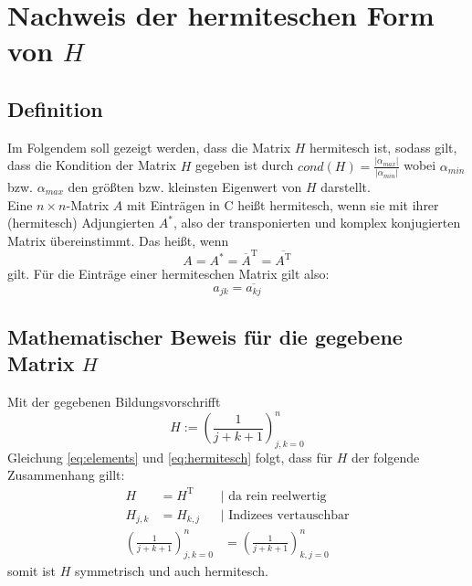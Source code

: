 \documentclass{beamer}
\begin{document}
  \section{Nachweis der hermiteschen Form von $H$}
  \subsection{Definition}
  \begin{frame}
    Im Folgendem soll gezeigt werden, dass die Matrix $H$ hermitesch ist, sodass gilt, dass die 
    Kondition der Matrix $H$ gegeben ist durch
    $cond(H)=\frac{|\alpha_{max}|}{|\alpha_{min}|}$ wobei $\alpha_{min}$ bzw. $\alpha_{max}$ 
    den größten bzw. kleinsten Eigenwert von $H$ darstellt.
    \\[1em]
    Eine \(n \times n\)-Matrix \(A\) mit Einträgen in \(\mathrm{C}\) heißt hermitesch, wenn sie mit
    ihrer (hermitesch) Adjungierten \(A^*\), also der transponierten und komplex konjugierten Matrix
    übereinstimmt. Das heißt, wenn
    \begin{equation}
      \label{eq:hermitesch}
        A = A^* = \overline A^{\mathrm T} = \overline{A^{\mathrm T}}
    \end{equation}
    gilt.
    Für die Einträge einer hermiteschen Matrix gilt also:
    \begin{equation}
    \label{eq:elements}
        a_{jk} = \overline{a_{kj}}
    \end{equation}
  \end{frame}
  
  \subsection{Mathematischer Beweis für die gegebene Matrix $H$}
  \begin{frame}
    Mit der gegebenen Bildungsvorschrifft
    \begin{equation}
        H := \left(\frac{1}{j+k+1}\right)_{j,k=0}^{n}
    \end{equation}
    Gleichung \ref{eq:elements} und \ref{eq:hermitesch} folgt, dass für \(H\) der
    folgende Zusammenhang gillt:
    \begin{align}
                                          H &= H^{\mathrm T} &&| \text{ da rein reelwertig}      \\
                                    H_{j,k} &= H_{k,j} &&| \text{ Indizees vertauschbar}         
    \end{align}    
    \begin{align}
    \left(\frac{1}{j+k+1}\right)_{j,k=0}^{n} &= \left(\frac{1}{j+k+1}\right)_{k,j=0}^{n} &&
    \end{align}
    somit ist \(H\) symmetrisch und auch hermitesch.
  \end{frame}
  
\end{document}
